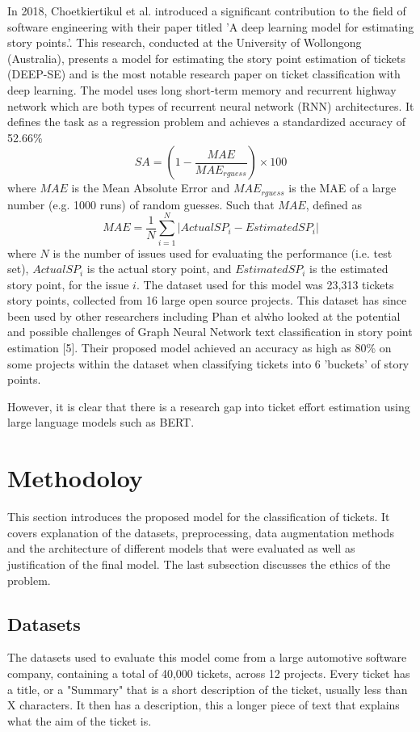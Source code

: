 \documentclass{UoYCSproject}
\begin{document}
In 2018, Choetkiertikul et al.
introduced a significant contribution to the field of software engineering with their paper titled 'A deep learning model for estimating story points.'.
This research, conducted at the University of Wollongong (Australia), presents a model for estimating the story point estimation of tickets (DEEP-SE) and is the most notable research paper on ticket classification with deep learning.
The model uses long short-term memory and recurrent highway network which are both types of recurrent neural network (RNN) architectures.
It defines the task as a regression problem and achieves a standardized accuracy of 52.66\%
\[SA = (1-\frac{MAE}{MAE_{rguess}}) \times 100\]
where $MAE$ is the Mean Absolute Error and $MAE_{rguess}$ is the MAE of a large number (e.g. 1000 runs) of random guesses. Such that $MAE$, defined as \[ MAE = \frac{1}{N}\sum_{i=1}^{N}|ActualSP_{i} - EstimatedSP_{i}|\] where $N$ is the number of issues used for evaluating the performance (i.e. test set), $ActualSP_i$ is the actual story point, and $EstimatedSP_i$ is the estimated story point, for the issue $i$.
The dataset used for this model was 23,313 tickets story points, collected from 16 large open source projects.
This dataset has since been used by other researchers including Phan et al\. who looked at the potential and possible challenges of Graph Neural Network text
classification in story point estimation [5].
Their proposed model achieved an accuracy as high as 80\% on some projects within the dataset when classifying tickets into 6 'buckets' of story points.

However, it is clear that there is a research gap into ticket effort estimation using large language models such as BERT.

\chapter{Methodoloy}
\label{ch:methodology}
This section introduces the proposed model for the classification of tickets.
It covers explanation of the datasets, preprocessing, data augmentation methods and the architecture of different models that were evaluated as well as justification of the final model.
The last subsection discusses the ethics of the problem.

\section{Datasets}\label{sec:datasets}
The datasets used to evaluate this model come from a large automotive software company, containing a total of 40,000 tickets, across 12 projects.
Every ticket has a title, or a "Summary" that is a short description of the ticket, usually less than X characters.
It then has a description, this a longer piece of text that explains what the aim of the ticket is. \par
\end{document}
